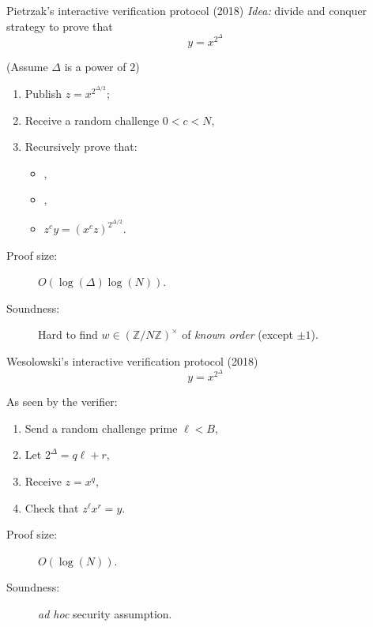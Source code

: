 \documentclass[aspectratio=169]{beamer}
\newcommand{\Z}{\mathbb{Z}}
\begin{document}
\begin{frame}[label=current]{Pietrzak's interactive verification protocol (2018)}
  \emph{Idea:} divide and conquer strategy to prove that
  \[y = x^{2^\Delta}\] 

  (Assume $\Delta$ is a power of $2$)
  \begin{enumerate}
  \item Publish \emph{$z = x^{2^{\Delta/2}}$};
  \item<2-> Receive a random challenge $0 < c < N$,
  \item Recursively prove that:
    \begin{itemize}
    \item {},
    \item {},
    \item<3-> \emph{$z^cy = (x^cz)^{2^{\Delta/2}}$}.
    \end{itemize}
  \end{enumerate}

  \medskip
  \begin{description}
  \item[Proof size:] $O(\log(\Delta)\log(N))$.
  \item[Soundness:] Hard to find $w\in(\Z/N\Z)^\times$ of \emph{known
      order} (except $\pm1$).
  \end{description}
\end{frame}


\begin{frame}{Wesolowski's interactive verification protocol (2018)}
  \[y=x^{2^\Delta}\]

  As seen by the verifier:
  \begin{enumerate}
  \item Send a random challenge prime $\ell < B$,
  \item Let \emph{$2^\Delta = q\ell + r$},
  \item Receive \emph{$z = x^q$},
  \item Check that \emph{$z^\ell x^r = y$}.
  \end{enumerate}

  \bigskip
  \begin{description}
  \item[Proof size:] $O(\log(N))$.
  \item[Soundness:] \textit{ad hoc} security assumption.
  \end{description}
\end{frame}
\end{document}
